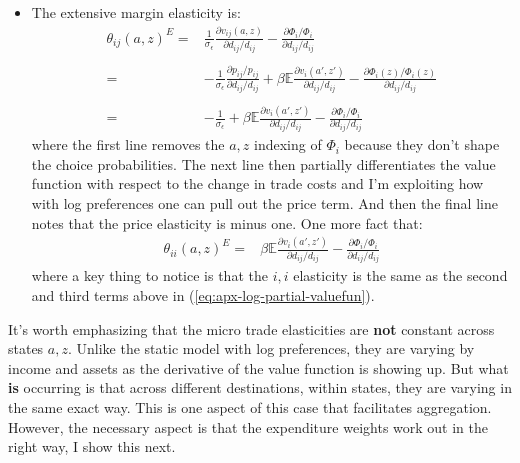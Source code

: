\documentclass[12pt,pdftex]{article}
\begin{document}
\begin{onehalfspacing}
\begin{itemize}
\item The extensive margin elasticity is:
\begin{align}
\theta_{ij}(a,z)^E =& \frac{1}{\sigma_{\epsilon}}\frac{\partial v_{ij}(a,z)}{\partial d_{ij}/d_{ij}} -  \frac{\partial \Phi_{i} / \Phi_{i}}{\partial d_{ij}/d_{ij}}\\
\nonumber \\
=& -\frac{1}{\sigma_{\epsilon}}\frac{\partial p_{ij} / p_{ij}}{\partial d_{ij}/d_{ij}} + \beta \mathbb{E} \frac{\partial v_{i}(a',z')}{\partial d_{ij}/d_{ij}} -  \frac{\partial \Phi_{i}(z) / \Phi_{i}(z)}{\partial d_{ij}/d_{ij}} \\
\nonumber \\
=& -\frac{1}{\sigma_{\epsilon}} + \beta \mathbb{E} \frac{\partial v_{i}(a',z')}{\partial d_{ij}/d_{ij}} -  \frac{\partial \Phi_{i} / \Phi_{i}}{\partial d_{ij}/d_{ij}}
\label{eq:apx-log-partial-valuefun}
\end{align}
where the first line removes the $a,z$ indexing of $\Phi_i$ because they don't shape the choice probabilities. The next line then partially differentiates the value function with respect to the change in trade costs and I'm exploiting how with log preferences one can pull out the price term. And then the final line notes that the price elasticity is minus one. One more fact that:
\begin{align}
\theta_{ii}(a,z)^E =&  \beta \mathbb{E} \frac{\partial v_{i}(a',z')}{\partial d_{ij}/d_{ij}} -  \frac{\partial \Phi_{i} / \Phi_{i}}{\partial d_{ij}/d_{ij}}
\end{align}
where a key thing to notice is that the $i,i$ elasticity is the same as the second and third terms above in (\ref{eq:apx-log-partial-valuefun}).
\end{itemize}
It's worth emphasizing that the micro trade elasticities are \textbf{not} constant across states $a,z$. Unlike the static model with log preferences, they are varying by income and assets as the derivative of the value function is showing up. But what \textbf{is} occurring is that across different destinations, within states, they are varying in the same exact way. This is one aspect of this case that facilitates aggregation. However, the necessary aspect is that the expenditure weights work out in the right way, I show this next. 


\end{onehalfspacing}
\end{document}
